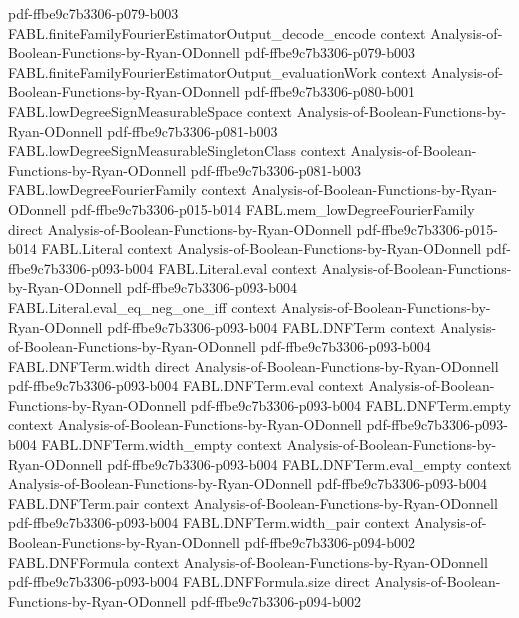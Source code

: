 \begin{theorem}
  {pdf-ffbe9c7b3306-p079-b003}
\proofstep
  {FABL.finiteFamilyFourierEstimatorOutput_decode_encode}
  {context}
  {Analysis-of-Boolean-Functions-by-Ryan-ODonnell}
  {pdf-ffbe9c7b3306-p079-b003}
\proofstep
  {FABL.finiteFamilyFourierEstimatorOutput_evaluationWork}
  {context}
  {Analysis-of-Boolean-Functions-by-Ryan-ODonnell}
  {pdf-ffbe9c7b3306-p080-b001}
\proofstep
  {FABL.lowDegreeSignMeasurableSpace}
  {context}
  {Analysis-of-Boolean-Functions-by-Ryan-ODonnell}
  {pdf-ffbe9c7b3306-p081-b003}
\proofstep
  {FABL.lowDegreeSignMeasurableSingletonClass}
  {context}
  {Analysis-of-Boolean-Functions-by-Ryan-ODonnell}
  {pdf-ffbe9c7b3306-p081-b003}
\proofstep
  {FABL.lowDegreeFourierFamily}
  {context}
  {Analysis-of-Boolean-Functions-by-Ryan-ODonnell}
  {pdf-ffbe9c7b3306-p015-b014}
\proofstep
  {FABL.mem_lowDegreeFourierFamily}
  {direct}
  {Analysis-of-Boolean-Functions-by-Ryan-ODonnell}
  {pdf-ffbe9c7b3306-p015-b014}
\proofstep
  {FABL.Literal}
  {context}
  {Analysis-of-Boolean-Functions-by-Ryan-ODonnell}
  {pdf-ffbe9c7b3306-p093-b004}
\proofstep
  {FABL.Literal.eval}
  {context}
  {Analysis-of-Boolean-Functions-by-Ryan-ODonnell}
  {pdf-ffbe9c7b3306-p093-b004}
\proofstep
  {FABL.Literal.eval_eq_neg_one_iff}
  {context}
  {Analysis-of-Boolean-Functions-by-Ryan-ODonnell}
  {pdf-ffbe9c7b3306-p093-b004}
\proofstep
  {FABL.DNFTerm}
  {context}
  {Analysis-of-Boolean-Functions-by-Ryan-ODonnell}
  {pdf-ffbe9c7b3306-p093-b004}
\proofstep
  {FABL.DNFTerm.width}
  {direct}
  {Analysis-of-Boolean-Functions-by-Ryan-ODonnell}
  {pdf-ffbe9c7b3306-p093-b004}
\proofstep
  {FABL.DNFTerm.eval}
  {context}
  {Analysis-of-Boolean-Functions-by-Ryan-ODonnell}
  {pdf-ffbe9c7b3306-p093-b004}
\proofstep
  {FABL.DNFTerm.empty}
  {context}
  {Analysis-of-Boolean-Functions-by-Ryan-ODonnell}
  {pdf-ffbe9c7b3306-p093-b004}
\proofstep
  {FABL.DNFTerm.width_empty}
  {context}
  {Analysis-of-Boolean-Functions-by-Ryan-ODonnell}
  {pdf-ffbe9c7b3306-p093-b004}
\proofstep
  {FABL.DNFTerm.eval_empty}
  {context}
  {Analysis-of-Boolean-Functions-by-Ryan-ODonnell}
  {pdf-ffbe9c7b3306-p093-b004}
\proofstep
  {FABL.DNFTerm.pair}
  {context}
  {Analysis-of-Boolean-Functions-by-Ryan-ODonnell}
  {pdf-ffbe9c7b3306-p093-b004}
\proofstep
  {FABL.DNFTerm.width_pair}
  {context}
  {Analysis-of-Boolean-Functions-by-Ryan-ODonnell}
  {pdf-ffbe9c7b3306-p094-b002}
\proofstep
  {FABL.DNFFormula}
  {context}
  {Analysis-of-Boolean-Functions-by-Ryan-ODonnell}
  {pdf-ffbe9c7b3306-p093-b004}
\proofstep
  {FABL.DNFFormula.size}
  {direct}
  {Analysis-of-Boolean-Functions-by-Ryan-ODonnell}
  {pdf-ffbe9c7b3306-p094-b002}

\end{theorem}
